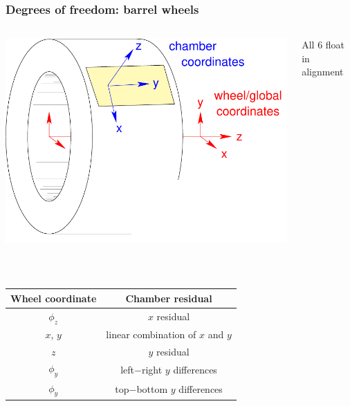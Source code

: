 \documentclass[compress]{beamer}
\begin{document}
\begin{frame}
\frametitle{Degrees of freedom: barrel wheels}
\begin{columns}
\includegraphics[height=4 cm]{wheel_parameters.pdf}
\begin{center}
All 6 float in alignment

\vspace{1 cm}
\mbox{ }
\end{center}
\end{columns}

\vspace{-1.2 cm}
\mbox{ } \hfill \renewcommand{\arraystretch}{1.2} \begin{tabular}{c c}
Wheel coordinate & Chamber residual \\\hline\hline
$\phi_z$ & $x$ residual \\
$x$, $y$ & linear combination of $x$ and $y$ \\\hline
$z$ & $y$ residual \\
$\phi_y$ & left$-$right $y$ differences \\
$\phi_y$ & top$-$bottom $y$ differences \\
\end{tabular}
\end{frame}
\end{document}
